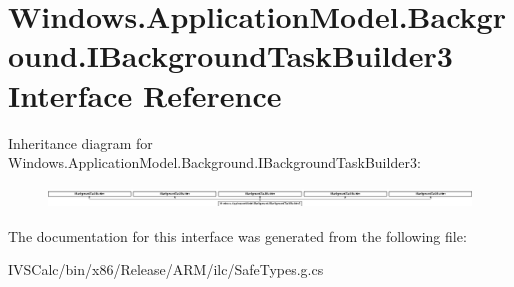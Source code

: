 \hypertarget{interface_windows_1_1_application_model_1_1_background_1_1_i_background_task_builder3}{}\section{Windows.\+Application\+Model.\+Background.\+I\+Background\+Task\+Builder3 Interface Reference}
\label{interface_windows_1_1_application_model_1_1_background_1_1_i_background_task_builder3}
Inheritance diagram for Windows.\+Application\+Model.\+Background.\+I\+Background\+Task\+Builder3\+:\begin{figure}[H]
\begin{center}
\leavevmode
\includegraphics[height=0.571429cm]{interface_windows_1_1_application_model_1_1_background_1_1_i_background_task_builder3}
\end{center}
\end{figure}


The documentation for this interface was generated from the following file\+:\begin{DoxyCompactItemize}
\item 
I\+V\+S\+Calc/bin/x86/\+Release/\+A\+R\+M/ilc/Safe\+Types.\+g.\+cs\end{DoxyCompactItemize}
